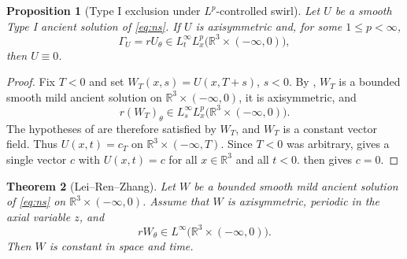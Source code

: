 \documentclass[11pt]{amsart}
\theoremstyle{plain}
\newtheorem{theorem}{Theorem}[section]
\newtheorem{proposition}[theorem]{Proposition}
\theoremstyle{definition}
\theoremstyle{remark}
\numberwithin{equation}{section}
\begin{document}
\begin{proposition}[Type I exclusion under \(L^p\)-controlled swirl]
\label{prop:lp-swirl-exclusion}
Let \(U\) be a smooth Type I ancient solution of \eqref{eq:ns}.  If \(U\) is
axisymmetric and, for some \(1\le p<\infty\),
\[
   \Gamma_U=rU_\theta\in L_t^\infty L_x^p
      \bigl(\mathbb R^3\times(-\infty,0)\bigr),
\]
then \(U\equiv0\).
\end{proposition}

\begin{proof}
Fix \(T<0\) and set \(W_T(x,s)=U(x,T+s)\), \(s<0\).  By
, \(W_T\) is a bounded smooth mild ancient solution on
\(\mathbb R^3\times(-\infty,0)\), it is axisymmetric, and
\[
   r(W_T)_\theta\in L_s^\infty L_x^p
      \bigl(\mathbb R^3\times(-\infty,0)\bigr).
\]
The hypotheses of  are therefore satisfied by \(W_T\), and
\(W_T\) is a constant vector field.  Thus \(U(x,t)=c_T\) on
\(\mathbb R^3\times(-\infty,T)\).  Since \(T<0\) was arbitrary,
 gives a single vector \(c\) with \(U(x,t)=c\) for
all \(x\in\mathbb R^3\) and all \(t<0\).   then
gives \(c=0\).
\end{proof}

\begin{theorem}[Lei--Ren--Zhang]\label{thm:lrz}
Let \(W\) be a bounded smooth mild ancient solution of \eqref{eq:ns} on
\(\mathbb R^3\times(-\infty,0)\).  Assume that \(W\) is axisymmetric,
periodic in the axial variable \(z\), and
\[
   rW_\theta\in L^\infty\bigl(\mathbb R^3\times(-\infty,0)\bigr).
\]
Then \(W\) is constant in space and time.
\end{theorem}
\end{document}
